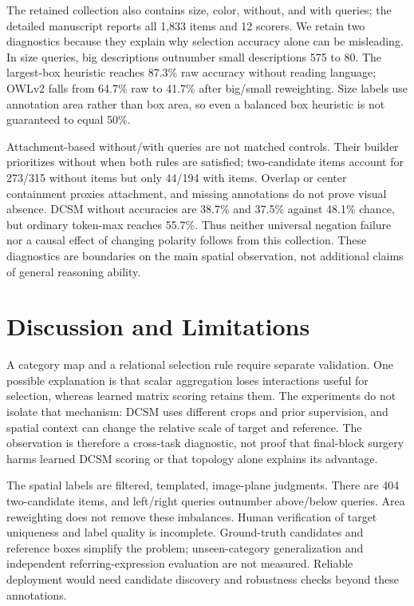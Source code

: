 \documentclass[10pt,twocolumn,letterpaper]{article}
\begin{document}
The retained collection also contains size, color, without, and with
queries; the detailed manuscript reports all 1,833 items and 12 scorers.
We retain two diagnostics because they explain why selection accuracy
alone can be misleading. In size queries, big descriptions outnumber
small descriptions 575 to 80. The largest-box heuristic reaches 87.3\%
raw accuracy without reading language; OWLv2 falls from 64.7\% raw to
41.7\% after big/small reweighting. Size labels use annotation area
rather than box area, so even a balanced box heuristic is not guaranteed
to equal 50\%.

Attachment-based without/with queries are not matched controls. Their
builder prioritizes without when both rules are satisfied; two-candidate
items account for 273/315 without items but only 44/194 with items.
Overlap or center containment proxies attachment, and missing
annotations do not prove visual absence. DCSM without accuracies are
38.7\% and 37.5\% against 48.1\% chance, but ordinary token-max reaches
55.7\%. Thus neither universal negation failure nor a causal effect of
changing polarity follows from this collection. These diagnostics are
boundaries on the main spatial observation, not additional claims of
general reasoning ability.

\balance
\section{Discussion and Limitations}\label{discussion-and-limitations}

A category map and a relational selection rule require separate
validation. One possible explanation is that scalar aggregation loses
interactions useful for selection, whereas learned matrix scoring
retains them. The experiments do not isolate that mechanism: DCSM uses
different crops and prior supervision, and spatial context can change
the relative scale of target and reference. The observation is therefore
a cross-task diagnostic, not proof that final-block surgery harms
learned DCSM scoring or that topology alone explains its advantage.

The spatial labels are filtered, templated, image-plane judgments. There
are 404 two-candidate items, and left/right queries outnumber
above/below queries. Area reweighting does not remove these imbalances.
Human verification of target uniqueness and label quality is incomplete.
Ground-truth candidates and reference boxes simplify the problem;
unseen-category generalization and independent referring-expression
evaluation are not measured. Reliable deployment would need candidate
discovery and robustness checks beyond these annotations.
\end{document}
